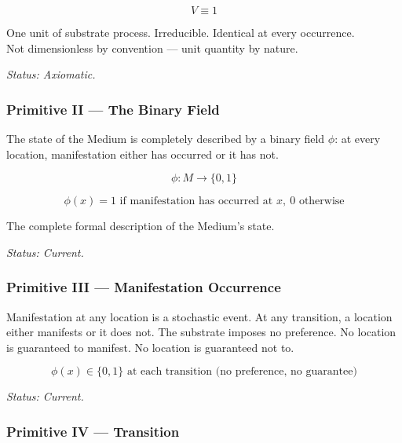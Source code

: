 \documentclass[11pt,letterpaper]{article}
\begin{document}
\begin{equation}
V \equiv 1
\end{equation}

\begin{center}
One unit of substrate process. Irreducible. Identical at every occurrence.\\
Not dimensionless by convention --- unit quantity by nature.
\end{center}

\emph{Status: Axiomatic.}
\subsubsection{Primitive II --- The Binary Field}
\label{sec:orgb5090d6}

The state of the Medium is completely described by a binary field \(\phi\): at every location, manifestation either has occurred or it has not.

\begin{equation}
\phi : M \to \{0, 1\}
\end{equation}

\begin{equation}
\phi(x) = 1 \text{ if manifestation has occurred at } x,\ 0 \text{ otherwise}
\end{equation}

\begin{center}
The complete formal description of the Medium's state.
\end{center}

\emph{Status: Current.}
\subsubsection{Primitive III --- Manifestation Occurrence}
\label{sec:orgf409f31}

Manifestation at any location is a stochastic event. At any transition, a location either manifests or it does not. The substrate imposes no preference. No location is guaranteed to manifest. No location is guaranteed not to.

\begin{equation}
\phi(x) \in \{0, 1\} \text{ at each transition (no preference, no guarantee)}
\end{equation}

\emph{Status: Current.}
\subsubsection{Primitive IV --- Transition}
\label{sec:org611e1b9}
\end{document}
